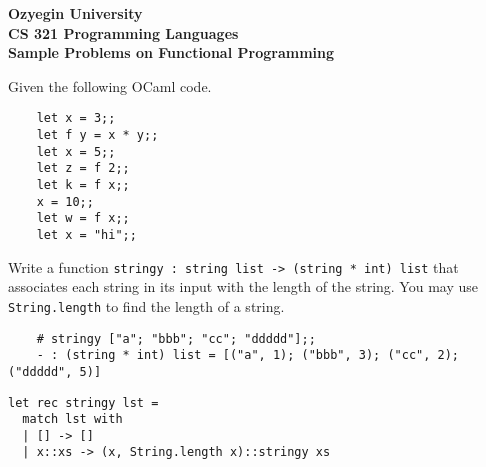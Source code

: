 \documentclass[addpoints]{exam}
\begin{document}
\begin{center}
{\Large \textbf{
    Ozyegin University\\
    CS 321 Programming Languages\\
    Sample Problems on Functional Programming
}}
\end{center}

\begin{questions}
  \question
  Given the following OCaml code.
  \begin{verbatim}
    let x = 3;;
    let f y = x * y;;
    let x = 5;;
    let z = f 2;;
    let k = f x;;
    x = 10;;
    let w = f x;;
    let x = "hi";;
  \end{verbatim}
  

  
  \question 
  Write a function \texttt{stringy : string list -> (string * int) list}
  that associates each string in its input with the length of the string.
  You may use \texttt{String.length} to find the length of a string.
  \begin{verbatim}
    # stringy ["a"; "bbb"; "cc"; "ddddd"];;                                               
    - : (string * int) list = [("a", 1); ("bbb", 3); ("cc", 2); ("ddddd", 5)]
  \end{verbatim}

  \begin{solutionbox}{3cm}
    \begin{verbatim}
let rec stringy lst =
  match lst with
  | [] -> []
  | x::xs -> (x, String.length x)::stringy xs
    \end{verbatim}
  \end{solutionbox}



\end{questions}
\end{document}
